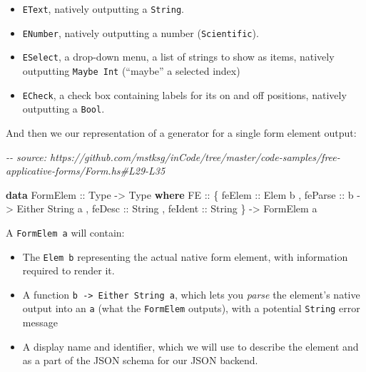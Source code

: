 \documentclass[]{article}
\newenvironment{Shaded}{}{}
\newcommand{\CommentTok}[1]{\textcolor[rgb]{0.38,0.63,0.69}{\textit{#1}}}
\newcommand{\DataTypeTok}[1]{\textcolor[rgb]{0.56,0.13,0.00}{#1}}
\newcommand{\KeywordTok}[1]{\textcolor[rgb]{0.00,0.44,0.13}{\textbf{#1}}}
\newcommand{\NormalTok}[1]{#1}
\newcommand{\OtherTok}[1]{\textcolor[rgb]{0.00,0.44,0.13}{#1}}
\begin{document}
\begin{itemize}
\tightlist
\item
  \texttt{EText}, natively outputting a \texttt{String}.
\item
  \texttt{ENumber}, natively outputting a number (\texttt{Scientific}).
\item
  \texttt{ESelect}, a drop-down menu, a list of strings to show as items,
  natively outputting \texttt{Maybe\ Int} (``maybe'' a selected index)
\item
  \texttt{ECheck}, a check box containing labels for its on and off positions,
  natively outputting a \texttt{Bool}.
\end{itemize}

And then we our representation of a generator for a single form element output:

\begin{Shaded}
\begin{Highlighting}[]
\CommentTok{{-}{-} source: https://github.com/mstksg/inCode/tree/master/code{-}samples/free{-}applicative{-}forms/Form.hs\#L29{-}L35}

\KeywordTok{data} \DataTypeTok{FormElem}\OtherTok{ ::} \DataTypeTok{Type} \OtherTok{{-}\textgreater{}} \DataTypeTok{Type} \KeywordTok{where}
    \DataTypeTok{FE}\OtherTok{ ::}\NormalTok{ \{}\OtherTok{ feElem  ::} \DataTypeTok{Elem}\NormalTok{ b}
\NormalTok{          ,}\OtherTok{ feParse ::}\NormalTok{ b }\OtherTok{{-}\textgreater{}} \DataTypeTok{Either} \DataTypeTok{String}\NormalTok{ a}
\NormalTok{          ,}\OtherTok{ feDesc  ::} \DataTypeTok{String}
\NormalTok{          ,}\OtherTok{ feIdent ::} \DataTypeTok{String}
\NormalTok{          \}}
        \OtherTok{{-}\textgreater{}} \DataTypeTok{FormElem}\NormalTok{ a}
\end{Highlighting}
\end{Shaded}

A \texttt{FormElem\ a} will contain:

\begin{itemize}
\tightlist
\item
  The \texttt{Elem\ b} representing the actual native form element, with
  information required to render it.
\item
  A function \texttt{b\ -\textgreater{}\ Either\ String\ a}, which lets you
  \emph{parse} the element's native output into an \texttt{a} (what the
  \texttt{FormElem} outputs), with a potential \texttt{String} error message
\item
  A display name and identifier, which we will use to describe the element and
  as a part of the JSON schema for our JSON backend.
\end{itemize}
\end{document}
